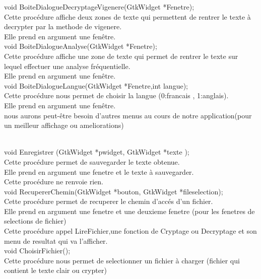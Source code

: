 \documentclass[a4]{article}
\begin{document}
	void BoiteDialogueDecryptageVigenere(GtkWidget *Fenetre);\\
		Cette procédure affiche deux zones de texte qui permettent de rentrer le texte à decrypter par la methode de vigenere.\\
		Elle prend en argument une fenêtre.\\
		
	void BoiteDialogueAnalyse(GtkWidget *Fenetre);\\
		Cette procédure affiche une zone de texte qui permet de rentrer le texte sur lequel effectuer une analyse fréquentielle.\\
		Elle prend en argument une fenêtre.\\
		
	void BoiteDialogueLangue(GtkWidget *Fenetre,int langue);\\
		Cette procédure nous permet de choisir la langue (0:francais , 1:anglais).\\
		Elle prend en argument une fenêtre.\\
		
	nous aurons peut-être besoin d'autres menus au cours de notre application(pour un meilleur affichage ou ameliorations) 
	
	\\
	
	void Enregistrer (GtkWidget *pwidget, GtkWidget *texte );\\
		Cette procédure permet de sauvegarder le texte obtenue.\\
		Elle prend en argument une fenetre et le texte à sauvegarder.\\
		Cette procédure ne renvoie rien.\\
	
	void RecupererChemin(GtkWidget *bouton, GtkWidget *fileselection);\\
		Cette procédure permet de recuperer le chemin d'accés d'un fichier.\\
		Elle prend en argument une fenetre et une deuxieme fenetre (pour les fenetres de selections de fichier)\\
		Cette procédure appel LireFichier,une fonction de Cryptage ou Decryptage et son menu de resultat qui va l'afficher.\\
		

	void ChoisirFichier();\\
		Cette procédure nous permet de selectionner un fichier à charger (fichier qui contient le texte clair ou 		crypter)\\
\end{document}
